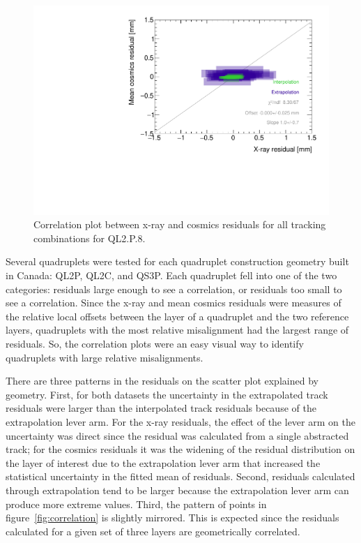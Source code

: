 \begin{figure}
    \centering
    \includegraphics[width = \textwidth]{figures/figure_QL2P08_3100V_2021-08-16_QL2P08_local_cosmic_and_xray_data_correlation_plot.pdf}
    \caption{Correlation plot between x-ray and cosmics residuals for all tracking combinations for QL2.P.8.}
    \label{fig:no_correlation}
\end{figure}

Several quadruplets were tested for each quadruplet construction geometry built in Canada: QL2P, QL2C, and QS3P. Each quadruplet fell into one of the two categories: residuals large enough to see a correlation, or residuals too small to see a correlation. Since the x-ray and mean cosmics residuals were measures of the relative local offsets between the layer of a quadruplet and the two reference layers, quadruplets with the most relative misalignment had the largest range of residuals. So, the correlation plots were an easy visual way to identify quadruplets with large relative misalignments.

There are three patterns in the residuals on the scatter plot explained by geometry. First, for both datasets the uncertainty in the extrapolated track residuals were larger than the interpolated track residuals because of the extrapolation lever arm. For the x-ray residuals, the effect of the lever arm on the uncertainty was direct since the residual was calculated from a single abstracted track; for the cosmics residuals it was the widening of the residual distribution on the layer of interest due to the extrapolation lever arm that increased the statistical uncertainty in the fitted mean of residuals. Second, residuals calculated through extrapolation tend to be larger because the extrapolation lever arm can produce more extreme values. Third, the pattern of points in figure~\ref{fig:correlation} is slightly mirrored. This is expected since the residuals calculated for a given set of three layers are geometrically correlated. 

